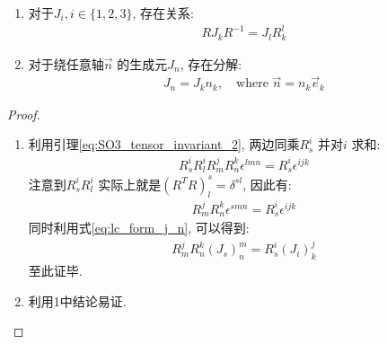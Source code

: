 \begin{theorem}
  \begin{enumerate}
    \item 对于$J_{i}, i\in \{1,2,3\}$, 存在关系:
      \begin{equation}
        \begin{aligned}
          R J_{k} R^{-1} = J_{l} R^{l}_{k}
        \end{aligned}
      \end{equation}

    \item 对于绕任意轴$\vec{n}$ 的生成元$J_{n}$, 存在分解:
      \begin{equation}\label{eq:j_decomposition}
        \begin{aligned}
          J_{n} = J_{k} n_{k},\quad \text{where } \vec{n} = n_{k}\vec{e}_{k}
        \end{aligned}
      \end{equation}
  \end{enumerate}
\end{theorem}
\begin{proof}
  \begin{enumerate}
    \item 利用引理\ref{eq:SO3_tensor_invariant_2}, 两边同乘$R^{i}_{s}$ 并对$i$ 求和:
      \begin{equation}
        \begin{aligned}
          R^{i}_{s}R^{i}_{l}R^{j}_{m}R^{k}_{n}\epsilon^{lmn} = R^{i}_{s}\epsilon^{ijk}
        \end{aligned}
      \end{equation}
      注意到$R^{i}_{s}R^{i}_{l}$ 实际上就是$(R^{T}R)^{s}_{l}=\delta^{sl}$,
      因此有:
      \begin{equation}
        \begin{aligned}
          R^{j}_{m}R^{k}_{n}\epsilon^{smn} = R^{i}_{s}\epsilon^{ijk}
        \end{aligned}
      \end{equation}
      同时利用式\ref{eq:lc_form_j_n}, 可以得到:
      \begin{equation}
        \begin{aligned}
          R^{j}_{m}R^{k}_{n}(J_{s})^{m}_{n} = R^{i}_{s}(J_{i})^{j}_{k}
        \end{aligned}
      \end{equation}
      至此证毕.
    \item 利用1中结论易证.
  \end{enumerate}
\end{proof}

